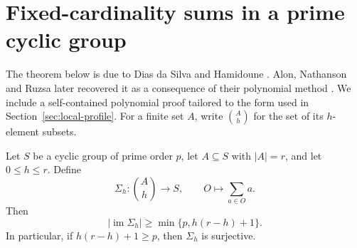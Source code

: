 \section{Fixed-cardinality sums in a prime cyclic group}
\label{app:restricted-fold}

The theorem below is due to Dias da Silva and Hamidoune \cite{DiasDaSilvaHamidoune1994}.  Alon, Nathanson and Ruzsa later recovered it as a consequence of their polynomial method \cite{AlonNathansonRuzsa1996}.  We include a self-contained polynomial proof tailored to the form used in Section~\ref{sec:local-profile}.  For a finite set $A$, write $\binom{A}{h}$ for the set of its $h$-element subsets.

\begin{theorem}\label{thm:restricted-fold}
Let $S$ be a cyclic group of prime order $p$, let $A\subseteq S$ with $|A|=r$, and let $0\le h\le r$.  Define
\[
\Sigma_h:\binom{A}{h}\longrightarrow S,
\qquad O\longmapsto\sum_{a\in O}a.
\]
Then
\[
|\operatorname{im}\Sigma_h|
\ge \min\{p,h(r-h)+1\}.
\]
In particular, if $h(r-h)+1\ge p$, then $\Sigma_h$ is surjective.
\end{theorem}

